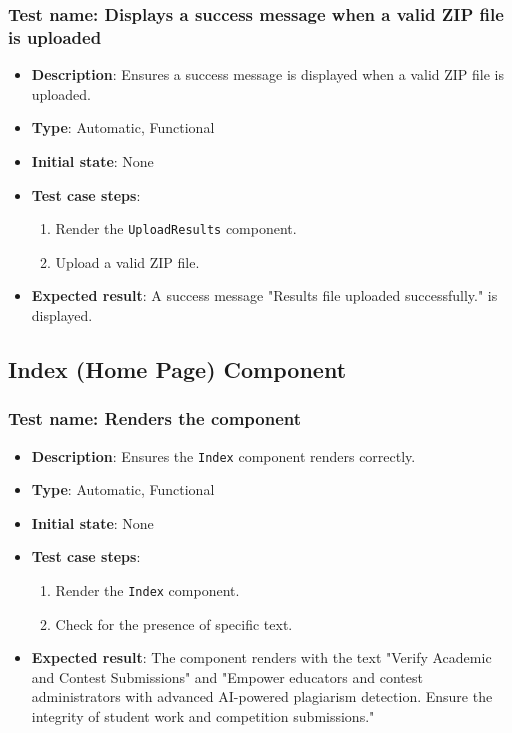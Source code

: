 \documentclass[12pt, titlepage]{article}
\begin{document}
\subsubsection{Test name: Displays a success message when a valid ZIP file is uploaded}
\begin{itemize}
    \item \textbf{Description}: Ensures a success message is displayed when a valid ZIP file is uploaded.
    \item \textbf{Type}: Automatic, Functional
    \item \textbf{Initial state}: None
    \item \textbf{Test case steps}:
    \begin{enumerate}
        \item Render the \texttt{UploadResults} component.
        \item Upload a valid ZIP file.
    \end{enumerate}
    \item \textbf{Expected result}: A success message "Results file uploaded successfully." is displayed.
\end{itemize}

\subsection{Index (Home Page) Component}

\subsubsection{Test name: Renders the component}
\begin{itemize}
    \item \textbf{Description}: Ensures the \texttt{Index} component renders correctly.
    \item \textbf{Type}: Automatic, Functional
    \item \textbf{Initial state}: None
    \item \textbf{Test case steps}:
    \begin{enumerate}
        \item Render the \texttt{Index} component.
        \item Check for the presence of specific text.
    \end{enumerate}
    \item \textbf{Expected result}: The component renders with the text "Verify Academic and Contest Submissions" and "Empower educators and contest administrators with advanced AI-powered plagiarism detection. Ensure the integrity of student work and competition submissions."
\end{itemize}
\end{document}
